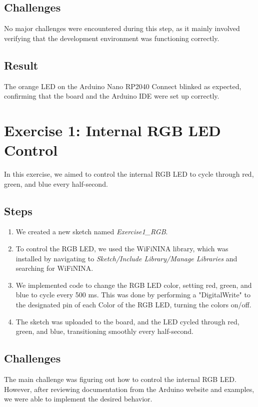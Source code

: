 \documentclass[a4paper,12pt]{article}
\begin{document}
	\subsection{Challenges}
	No major challenges were encountered during this step, as it mainly involved verifying that the development environment was functioning correctly.
	
	\subsection{Result}
	The orange LED on the Arduino Nano RP2040 Connect blinked as expected, confirming that the board and the Arduino IDE were set up correctly.
	
	\section{Exercise 1: Internal RGB LED Control}
	In this exercise, we aimed to control the internal RGB LED to cycle through red, green, and blue every half-second.
	
	\subsection{Steps}
	\begin{enumerate}
		\item We created a new sketch named \textit{Exercise1\_RGB}.
		\item To control the RGB LED, we used the WiFiNINA library, which was installed by navigating to \textit{Sketch/Include Library/Manage Libraries} and searching for WiFiNINA.
		\item We implemented code to change the RGB LED color, setting red, green, and blue to cycle every 500 ms. This was done by performing a "DigitalWrite" to the designated pin of each Color of the RGB LED, turning the colors on/off.
		\item The sketch was uploaded to the board, and the LED cycled through red, green, and blue, transitioning smoothly every half-second.
	\end{enumerate}
	
	\subsection{Challenges}
	The main challenge was figuring out how to control the internal RGB LED. However, after reviewing documentation from the Arduino website and examples, we were able to implement the desired behavior.
	
\end{document}
